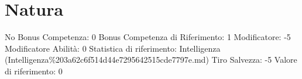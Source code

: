 \section{Natura}\label{natura}

\begin{description}
\tightlist
\item[Tags: ABI]
No Bonus Competenza: 0 Bonus Competenza di Riferimento: 1 Modificatore:
-5 Modificatore Abilità: 0 Statistica di riferimento: Intelligenza
(Intelligenza\%203a62c6f514d44e7295642515cde7797e.md) Tiro Salvezza: -5
Valore di riferimento: 0
\end{description}
